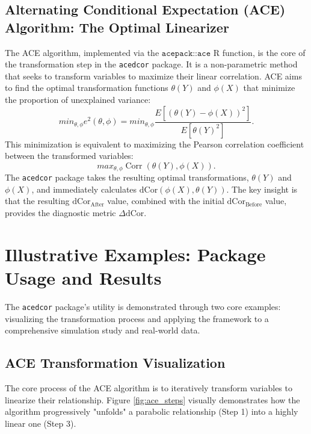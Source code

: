 \documentclass[a4paper,fleqn]{cas-sc}
\DeclareMathOperator{\Corr}{Corr}
\newcommand{\dCor}{\mathrm{dCor}}
\begin{document}
\subsection{Alternating Conditional Expectation (ACE) Algorithm: The Optimal Linearizer}
The ACE algorithm, implemented via the $\texttt{acepack::ace}$ R function, is the core of the transformation step in the \texttt{acedcor} package. It is a non-parametric method that seeks to transform variables to maximize their linear correlation. ACE aims to find the optimal transformation functions $\theta(Y)$ and $\phi(X)$ that minimize the proportion of unexplained variance:
$$min_{\theta,\phi}e^{2}(\theta,\phi)=min_{\theta,\phi}\frac{E[(\theta(Y)-\phi(X))^{2}]}{E[\theta(Y)^{2}]}.$$
This minimization is equivalent to maximizing the Pearson correlation coefficient between the transformed variables:
$$max_{\theta,\phi}\Corr(\theta(Y),\phi(X)).$$
The \texttt{acedcor} package takes the resulting optimal transformations, $\theta(Y)$ and $\phi(X)$, and immediately calculates $\dCor(\phi(X), \theta(Y))$. The key insight is that the resulting $\dCor_{\text{After}}$ value, combined with the initial $\dCor_{\text{Before}}$ value, provides the diagnostic metric $\Delta\dCor$.

\section{Illustrative Examples: Package Usage and Results}
\label{sec:examples}
The \texttt{acedcor} package's utility is demonstrated through two core examples: visualizing the transformation process and applying the framework to a comprehensive simulation study and real-world data.

\subsection{ACE Transformation Visualization}
The core process of the ACE algorithm is to iteratively transform variables to linearize their relationship. Figure \ref{fig:ace_steps} visually demonstrates how the algorithm progressively "unfolds" a parabolic relationship (Step 1) into a highly linear one (Step 3).
\end{document}
